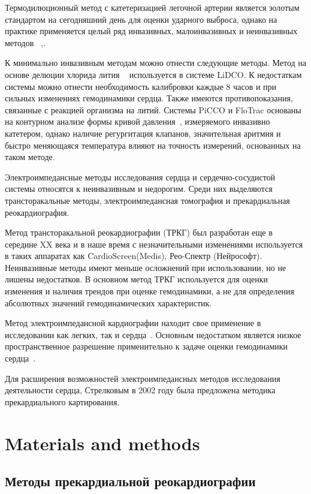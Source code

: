 \documentclass[conference]{IEEEtran}
\begin{document}
Термодилюционный метод с катетеризацией легочной артерии является золотым стандартом на сегодняшний день для оценки ударного выброса, однако  на практике применяется целый ряд инвазивных, малоинвазивных и неинвазивных методов ~\cite{Kobe2019},\cite{Mehta2014}.

К минимально инвазивным методам можно отнести следующие методы.
Метод на основе делюции хлорида лития ~\cite{Linton1993} используется в системе LiDCO.
К недостаткам системы можно отнести необходимость калибровки каждые 8 часов и при сильных изменениях гемодинамики сердца.
Также имеются противопоказания, связанные с реакцией организма на литий.
Системы PiCCO и FloTrac основаны на контурном анализе формы кривой давления~\cite{Horster2012}, измеряемого инвазивно катетером, однако наличие регургитация клапанов, значительная аритмия и быстро меняющаяся температура влияют на точность измерений, основанных на таком методе.

Электроимпедансные методы исследования сердца и сердечно-сосудистой системы относятся к неинвазивным и недорогим.
Среди них выделяются трансторакальные методы, электроимпедансная томография и прекардиальная реокардиография.

Метод трансторакальной реокардиографии (ТРКГ) был разработан еще в середине XX века и в наше время с незначительными изменениями используется в таких аппаратах как CardioScreen(Medis), Рео-Спектр (Нейрософт).
Неинвазивные методы имеют меньше осложнений при использовании, но не лишены недостатков.
В основном метод ТРКГ используется для оценки изменения и наличия трендов при оценке гемодинамики, а не для определения абсолютных значений гемодинамических характеристик.

Метод электроимпедансной кардиографии находит свое применение в исследовании как легких, так и сердца~\cite{Brown2003, Wu2018}.
Основным недостатком является низкое пространственное разрешение применительно к задаче оценки гемодинамики сердца~\cite{Kircher2019, Rymarczyk2019}.

Для расширения возможностей электроимпедансных методов исследования деятельности сердца, Стрелковым в 2002 году была предложена методика прекардиального картирования.

\section{Materials and methods}

\subsection{Методы прекардиальной реокардиографии}
\end{document}
